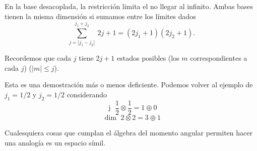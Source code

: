 \documentclass[10pt,oneside]{CBFT_book}
\begin{document}
En la base desacoplada, la restricción limita el no llegar al infinito.
Ambas bases tienen la misma dimensión si sumamos entre los límites dados
\[
	\sum_{j=|j_1-j_2|}^{ j_1 + j_2 } \: 2j+1 = (2j_1 + 1)(2j_2 + 1).
\]

Recordemos que cada $j$ tiene $2j+1$ estados posibles (los $m$ correspondientes a 
cada $j$) ($|m|\leq j$). 

Esta es una demostración más o menos deficiente. Podemos volver al ejemplo de 
$j_1 = 1/2$ y $j_2=1/2$ considerando
\[
	\text{ j } \; \frac{1}{2} \otimes \frac{1}{2} = 1 \oplus 0 
\]
\[
	\text{ dim } \; {2} \otimes {2} = 3 \oplus 1
\]

Cualesquiera cosas que cumplan el álgebra del momento angular permiten hacer una
analogía es un espacio símil.
\end{document}
